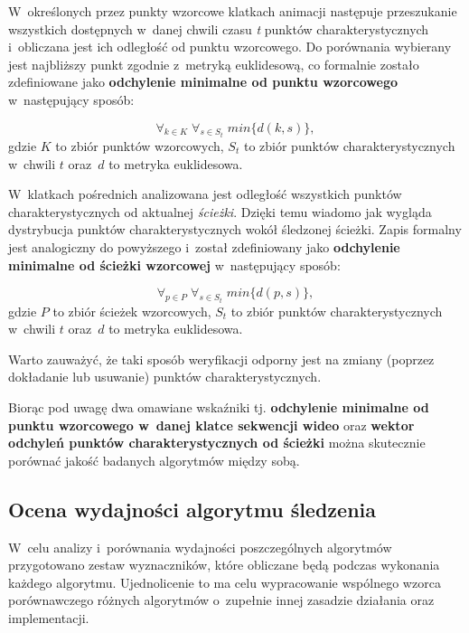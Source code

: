       W~określonych przez punkty wzorcowe klatkach animacji następuje przeszukanie wszystkich dostępnych w~danej chwili czasu \textit{t} punktów charakterystycznych i~obliczana jest ich odległość od punktu wzorcowego. Do porównania wybierany jest najbliższy punkt zgodnie z~metryką euklidesową, co formalnie zostało zdefiniowane jako \textbf{odchylenie minimalne od punktu wzorcowego} w~następujący sposób:

        \begin{equation}
          \forall_{k\in K} \; \forall_{s \in S_{t}} \; min\{ d(k, s) \},
        \end{equation}
      gdzie $K$ to zbiór punktów wzorcowych, $S_{t}$ to zbiór punktów charakterystycznych w~chwili $t$ oraz~$d$ to metryka euklidesowa.

      W~klatkach pośrednich analizowana jest odległość wszystkich punktów charakterystycznych od aktualnej \textit{ścieżki}. Dzięki temu wiadomo jak wygląda dystrybucja punktów charakterystycznych wokół śledzonej ścieżki. Zapis formalny jest analogiczny do powyższego i~został zdefiniowany jako \textbf{odchylenie minimalne od ścieżki wzorcowej} w~następujący sposób:

        \begin{equation}
          \forall_{p\in P} \; \forall_{s \in S_{t}} \; min\{ d(p, s) \},
        \end{equation}
      gdzie $P$ to zbiór ścieżek wzorcowych, $S_{t}$ to zbiór punktów charakterystycznych w~chwili $t$ oraz~$d$ to metryka euklidesowa.

      Warto zauważyć, że taki sposób weryfikacji odporny jest na zmiany (poprzez dokładanie lub usuwanie) punktów charakterystycznych.

      Biorąc pod uwagę dwa omawiane wskaźniki tj. \textbf{odchylenie minimalne od punktu wzorcowego w~danej klatce sekwencji wideo} oraz \textbf{wektor odchyleń punktów charakterystycznych od ścieżki} można skutecznie porównać jakość badanych algorytmów między sobą.

    \subsection{Ocena wydajności algorytmu śledzenia}\label{Subsection_Wydajnosc}

      W~celu analizy i~porównania wydajności poszczególnych algorytmów przygotowano zestaw wyznaczników, które obliczane będą podczas wykonania każdego algorytmu. Ujednolicenie to ma celu wypracowanie wspólnego wzorca porównawczego różnych algorytmów o~zupełnie innej zasadzie działania oraz implementacji.

